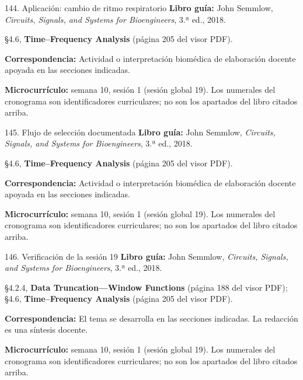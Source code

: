 \documentclass[
  10pt,
  ignorenonframetext,
  aspectratio=169,
  spanish,
]{beamer}
\begin{document}
\begin{frame}{144. Aplicación: cambio de ritmo respiratorio}
\label{aplicaciuxf3n-cambio-de-ritmo-respiratorio}
\textbf{Libro guía:} John Semmlow, \emph{Circuits, Signals, and Systems
for Bioengineers}, 3.ª ed., 2018.

§4.6, \textbf{Time--Frequency Analysis} (página 205 del visor PDF).

\textbf{Correspondencia:} Actividad o interpretación biomédica de
elaboración docente apoyada en las secciones indicadas.

\textbf{Microcurrículo:} semana 10, sesión 1 (sesión global 19). Los
numerales del cronograma son identificadores curriculares; no son los
apartados del libro citados arriba.
\end{frame}

\begin{frame}{145. Flujo de selección documentada}
\label{flujo-de-selecciuxf3n-documentada}
\textbf{Libro guía:} John Semmlow, \emph{Circuits, Signals, and Systems
for Bioengineers}, 3.ª ed., 2018.

§4.6, \textbf{Time--Frequency Analysis} (página 205 del visor PDF).

\textbf{Correspondencia:} Actividad o interpretación biomédica de
elaboración docente apoyada en las secciones indicadas.

\textbf{Microcurrículo:} semana 10, sesión 1 (sesión global 19). Los
numerales del cronograma son identificadores curriculares; no son los
apartados del libro citados arriba.
\end{frame}

\begin{frame}{146. Verificación de la sesión 19}
\label{verificaciuxf3n-de-la-sesiuxf3n-19}
\textbf{Libro guía:} John Semmlow, \emph{Circuits, Signals, and Systems
for Bioengineers}, 3.ª ed., 2018.

§4.2.4, \textbf{Data Truncation---Window Functions} (página 188 del
visor PDF); §4.6, \textbf{Time--Frequency Analysis} (página 205 del
visor PDF).

\textbf{Correspondencia:} El tema se desarrolla en las secciones
indicadas. La redacción es una síntesis docente.

\textbf{Microcurrículo:} semana 10, sesión 1 (sesión global 19). Los
numerales del cronograma son identificadores curriculares; no son los
apartados del libro citados arriba.
\end{frame}
\end{document}
